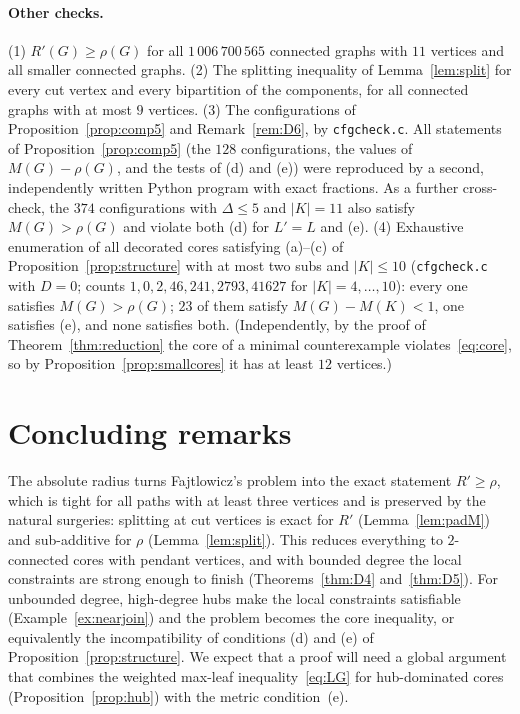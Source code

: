 \documentclass[11pt]{amsart}
\theoremstyle{definition}
\newcommand{\Rp}{R'}
\begin{document}
\paragraph{Other checks.} (1) $\Rp(G)\ge\rho(G)$ for all $1\,006\,700\,565$ connected graphs with $11$ vertices and all
smaller connected graphs. (2) The splitting inequality of Lemma~\ref{lem:split} for every cut vertex and every
bipartition of the components, for all connected graphs with at most $9$ vertices. (3) The configurations of
Proposition~\ref{prop:comp5} and Remark~\ref{rem:D6}, by \texttt{cfgcheck.c}. All statements of
Proposition~\ref{prop:comp5} (the $128$ configurations, the values of $M(G)-\rho(G)$, and the tests of (d) and (e))
were reproduced by a second, independently written Python program with exact fractions. As a further cross-check, the $374$
configurations with $\Delta\le5$ and $|K|=11$ also satisfy $M(G)>\rho(G)$ and violate both (d) for $L'=L$ and (e).
(4) Exhaustive enumeration of all decorated cores satisfying (a)--(c) of Proposition~\ref{prop:structure} with at most
two subs and $|K|\le10$ (\texttt{cfgcheck.c} with $D=0$; counts $1,0,2,46,241,2793,41627$ for $|K|=4,\dots,10$):
every one satisfies $M(G)>\rho(G)$; $23$ of them satisfy $M(G)-M(K)<1$, one satisfies (e), and none satisfies
both. (Independently, by the proof of Theorem~\ref{thm:reduction} the core of a minimal counterexample
violates~\eqref{eq:core}, so by Proposition~\ref{prop:smallcores} it has at least $12$ vertices.)

\section{Concluding remarks}\label{sec:concl}

The absolute radius turns Fajtlowicz's problem into the exact statement $\Rp\ge\rho$, which is tight for all paths with at least three vertices and
is preserved by the natural surgeries: splitting at cut vertices is exact for $\Rp$ (Lemma~\ref{lem:padM}) and
sub-additive for $\rho$ (Lemma~\ref{lem:split}). This reduces everything to $2$-connected cores with pendant vertices,
and with bounded degree the local constraints are strong enough to finish (Theorems~\ref{thm:D4} and~\ref{thm:D5}).
For unbounded degree, high-degree hubs make the local constraints satisfiable (Example~\ref{ex:nearjoin}) and the
problem becomes the core inequality, or equivalently the incompatibility of conditions (d) and (e) of
Proposition~\ref{prop:structure}. We expect that a proof will need a global argument that combines the weighted
max-leaf inequality~\eqref{eq:LG} for hub-dominated cores (Proposition~\ref{prop:hub}) with the metric condition~(e).
\end{document}
